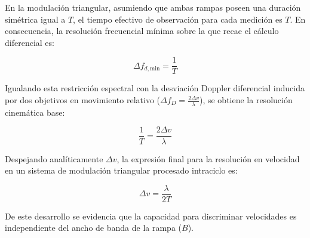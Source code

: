 En la modulación triangular, asumiendo que ambas rampas poseen una duración simétrica igual a $T$, el tiempo efectivo de observación para cada medición es $T$. En consecuencia, la resolución frecuencial mínima sobre la que recae el cálculo diferencial es:

\begin{equation}
    \Delta f_{d,\text{min}} = \frac{1}{T}
    \label{eq:res_freq_doppler}
\end{equation}

Igualando esta restricción espectral con la desviación Doppler diferencial inducida por dos objetivos en movimiento relativo ($\Delta f_D = \frac{2\Delta v}{\lambda}$), se obtiene la resolución cinemática base:

\begin{equation}
    \frac{1}{T} = \frac{2\Delta v}{\lambda}
    \label{eq:igualdad_resolucion_vel}
\end{equation}

Despejando analíticamente $\Delta v$, la expresión final para la resolución en velocidad en un sistema de modulación triangular procesado intraciclo es:

\begin{equation}
    \Delta v = \frac{\lambda}{2 T}
    \label{eq:res_velocidad}
\end{equation}

De este desarrollo se evidencia que la capacidad para discriminar velocidades es independiente del ancho de banda de la rampa ($B$).